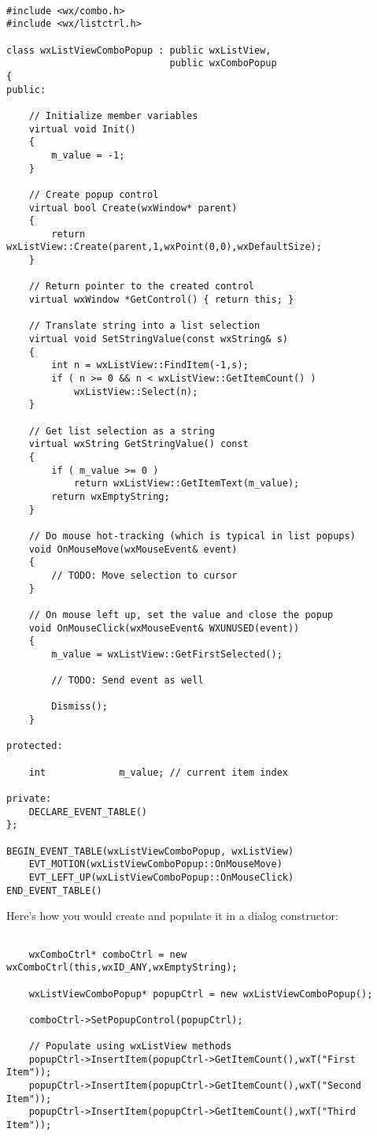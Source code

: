\begin{verbatim}

#include <wx/combo.h>
#include <wx/listctrl.h>

class wxListViewComboPopup : public wxListView,
                             public wxComboPopup
{
public:

    // Initialize member variables
    virtual void Init()
    {
        m_value = -1;
    }

    // Create popup control
    virtual bool Create(wxWindow* parent)
    {
        return wxListView::Create(parent,1,wxPoint(0,0),wxDefaultSize);
    }

    // Return pointer to the created control
    virtual wxWindow *GetControl() { return this; }

    // Translate string into a list selection
    virtual void SetStringValue(const wxString& s)
    {
        int n = wxListView::FindItem(-1,s);
        if ( n >= 0 && n < wxListView::GetItemCount() )
            wxListView::Select(n);
    }

    // Get list selection as a string
    virtual wxString GetStringValue() const
    {
        if ( m_value >= 0 )
            return wxListView::GetItemText(m_value);
        return wxEmptyString;
    }

    // Do mouse hot-tracking (which is typical in list popups)
    void OnMouseMove(wxMouseEvent& event)
    {
        // TODO: Move selection to cursor
    }

    // On mouse left up, set the value and close the popup
    void OnMouseClick(wxMouseEvent& WXUNUSED(event))
    {
        m_value = wxListView::GetFirstSelected();

        // TODO: Send event as well

        Dismiss();
    }

protected:

    int             m_value; // current item index

private:
    DECLARE_EVENT_TABLE()
};

BEGIN_EVENT_TABLE(wxListViewComboPopup, wxListView)
    EVT_MOTION(wxListViewComboPopup::OnMouseMove)
    EVT_LEFT_UP(wxListViewComboPopup::OnMouseClick)
END_EVENT_TABLE()

\end{verbatim}

Here's how you would create and populate it in a dialog constructor:

\begin{verbatim}

    wxComboCtrl* comboCtrl = new wxComboCtrl(this,wxID_ANY,wxEmptyString);

    wxListViewComboPopup* popupCtrl = new wxListViewComboPopup();

    comboCtrl->SetPopupControl(popupCtrl);

    // Populate using wxListView methods
    popupCtrl->InsertItem(popupCtrl->GetItemCount(),wxT("First Item"));
    popupCtrl->InsertItem(popupCtrl->GetItemCount(),wxT("Second Item"));
    popupCtrl->InsertItem(popupCtrl->GetItemCount(),wxT("Third Item"));

\end{verbatim}

